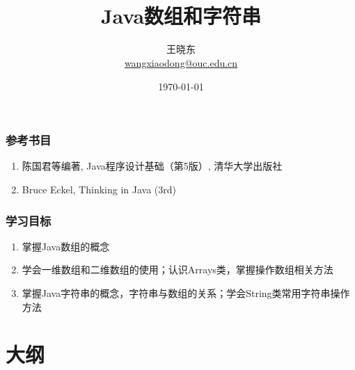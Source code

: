 
\title[Wang Xiaodong]{\\  
  Java数组和字符串}
\author[王晓东]{王晓东\\
  \href{mailto:wangxiaodong@ouc.edu.cn}{\footnotesize wangxiaodong@ouc.edu.cn}}
\date{\today}


\frame{\titlepage}

\begin{frame}
\frametitle{参考书目}
\begin{enumerate}
\item 陈国君等编著, Java程序设计基础（第5版）, 清华大学出版社
\item Bruce Eckel, Thinking in Java (3rd)
\end{enumerate}  
\end{frame}

\begin{frame}
  \frametitle{学习目标}
  \begin{enumerate}
  \item 掌握Java数组的概念
  \item 学会一维数组和二维数组的使用；认识Arrays类，掌握操作数组相关方法
  \item 掌握Java字符串的概念，字符串与数组的关系；学会String类常用字符串操作方法
  \end{enumerate}
\end{frame}

\section*{大纲}

